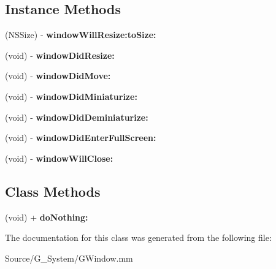 \subsection*{Instance Methods}
\begin{DoxyCompactItemize}
\item 
(N\+S\+Size) -\/ {\bfseries window\+Will\+Resize\+:to\+Size\+:}\hypertarget{interfaceGWDelegate_abfdd429cc49d59b4df11246a60bf408f}{}\label{interfaceGWDelegate_abfdd429cc49d59b4df11246a60bf408f}

\item 
(void) -\/ {\bfseries window\+Did\+Resize\+:}\hypertarget{interfaceGWDelegate_a665568e3f51c44e4231ad609e4151a9b}{}\label{interfaceGWDelegate_a665568e3f51c44e4231ad609e4151a9b}

\item 
(void) -\/ {\bfseries window\+Did\+Move\+:}\hypertarget{interfaceGWDelegate_a84abecd6d6a492efb9db7fe3470286d6}{}\label{interfaceGWDelegate_a84abecd6d6a492efb9db7fe3470286d6}

\item 
(void) -\/ {\bfseries window\+Did\+Miniaturize\+:}\hypertarget{interfaceGWDelegate_a102e272bad6f6ecdd1f223da31acb35f}{}\label{interfaceGWDelegate_a102e272bad6f6ecdd1f223da31acb35f}

\item 
(void) -\/ {\bfseries window\+Did\+Deminiaturize\+:}\hypertarget{interfaceGWDelegate_a329e8ca8065b9207426f7b40146f6496}{}\label{interfaceGWDelegate_a329e8ca8065b9207426f7b40146f6496}

\item 
(void) -\/ {\bfseries window\+Did\+Enter\+Full\+Screen\+:}\hypertarget{interfaceGWDelegate_a647269c41516a6817ddba28fc925ff1a}{}\label{interfaceGWDelegate_a647269c41516a6817ddba28fc925ff1a}

\item 
(void) -\/ {\bfseries window\+Will\+Close\+:}\hypertarget{interfaceGWDelegate_afd5e0a629e84bf27aed1cb2fd25374f5}{}\label{interfaceGWDelegate_afd5e0a629e84bf27aed1cb2fd25374f5}

\end{DoxyCompactItemize}
\subsection*{Class Methods}
\begin{DoxyCompactItemize}
\item 
(void) + {\bfseries do\+Nothing\+:}\hypertarget{interfaceGWDelegate_aba1cc9dc7da62ffe833043e14eb0c5e7}{}\label{interfaceGWDelegate_aba1cc9dc7da62ffe833043e14eb0c5e7}

\end{DoxyCompactItemize}


The documentation for this class was generated from the following file\+:\begin{DoxyCompactItemize}
\item 
Source/\+G\+\_\+\+System/G\+Window.\+mm\end{DoxyCompactItemize}
